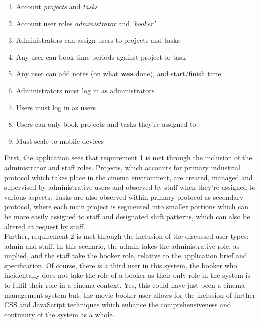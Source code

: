\documentclass[11pt, english]{article}
\begin{document}
	\begin{enumerate}
        \setlength\itemsep{0cm}
                \item Account \textit{projects} and \textit{tasks}
                \item Account user roles \textit{administrator} and \textit{`booker'}
                \item Administrators can assign users to projects and tasks
                \item Any user can book time periods against project or task
                \item Any user can add notes (on what \textbf{was} done), and start/finish time
                \item Administrators must log in as administrators
                \item Users must log in as users
                \item Users can only book projects and tasks they're assigned to
                \item Must scale to mobile devices
        \end{enumerate}

	First, the application sees that requirement 1 is met through the inclusion of the administrator and staff roles. Projects, which accounts for primary industrial protocol which takes place in the cinema environment, are created, managed and supervised by administrative users and observed by staff when they're assigned to various aspects. Tasks are also observed within primary protocol as secondary protocol, where each main project is segmented into smaller portions which can be more easily assigned to staff and designated shift patterns, which can also be altered at request by staff.\\

	Further, requirement 2 is met through the inclusion of the discussed user types: admin and staff. In this scenario, the admin takes the administrative role, as implied, and the staff take the booker role, relative to the application brief and specification. Of course, there is a third user in this system, the booker who incidentally does not take the role of a booker as their only role in the system is to fulfil their role in a cinema context. Yes, this could have just been a cinema management system but, the movie booker user allows for the inclusion of further CSS and JavaScript techniques which enhance the comprehensiveness and continuity of the system as a whole.\\
\end{document}
